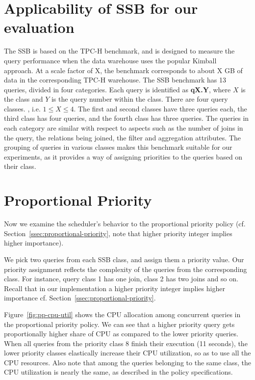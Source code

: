 \section{Applicability of SSB for our evaluation}\label{apx:ssb}
The SSB is based on the TPC-H benchmark, and is designed to measure the query performance when %
the data warehouse uses the popular Kimball~\cite{Kimball} approach. 
At a scale factor of X, the benchmark corresponds to about X GB of data in the 
corresponding TPC-H warehouse.
The SSB benchmark has 13 queries, divided in four categories. 
Each query is identified as \textbf{qX.Y}, where $X$ is the class and $Y$ is the query 
number within the class.
There are four query classes. 
, i.e. $1\leq X\leq4$. 
The first and second classes have three queries each, the third class has four queries, and 
the fourth class has three queries.
The queries in each category are similar with respect to aspects such as the 
number of joins in the query, the relations being joined, the filter and aggregation 
attributes. 
The grouping of queries in various classes makes this benchmark suitable for our 
experiments, as it provides a way of assigning priorities to the queries based on their class. 

\section{Proportional Priority}\label{apx:pp-policy-exp}
Now we examine the scheduler's behavior to the proportional priority policy (cf. Section~\ref{ssec:proportional-priority}, note that higher priority integer implies higher importance).

We pick two queries from each SSB class, and assign them a priority value. 
Our priority assignment reflects the complexity of the queries from the corresponding class. 
For instance, query class 1 has one join, class 2 has two joins and so on.
Recall that in our implementation a higher priority integer implies higher importance cf. 
Section~\ref{ssec:proportional-priority}.

Figure~\ref{fig:pp-cpu-util} shows the CPU allocation among concurrent queries in the proportional priority policy.
We can see that a higher priority query gets proportionally higher share of CPU as 
compared to the lower priority queries.
When all queries from the priority class 8 finish their execution (11 seconds), the 
lower priority classes elastically increase their CPU utilization, so as to use all the CPU 
resources. 
Also note that among the queries belonging to the same class, the CPU utilization is 
nearly the same, as described in the policy specifications.

